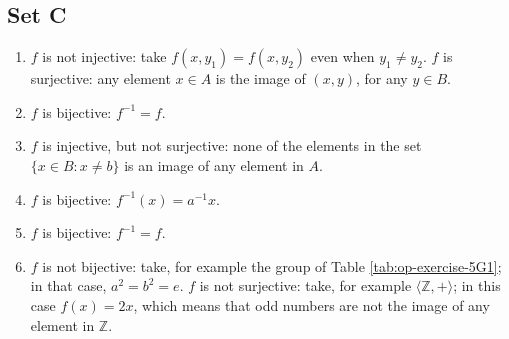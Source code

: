 \documentclass{article}
\newcommand{\angled}[1]{\langle#1\rangle}
\begin{document}
\subsection{Set C}
\begin{enumerate}
    \item $f$ is not injective: take $f(x, y_1) = f(x, y_2)$ even when $y_1 \ne y_2$. $f$ is surjective: any element $x \in A$ is the image of $(x, y)$, for any $y \in B$.

    \item $f$ is bijective: $f^{-1} = f$.

    \item $f$ is injective, but not surjective: none of the elements in the set $\{x \in B: x \ne b\}$ is an image of any element in $A$.

    \item $f$ is bijective: $f^{-1}(x) = a^{-1}x$.

    \item $f$ is bijective: $f^{-1} = f$.

    \item $f$ is not bijective: take, for example the group of Table \ref{tab:op-exercise-5G1}; in that case, $a^2 = b^2 = e$. $f$ is not surjective: take, for example $\angled{\mathbb{Z}, +}$; in this case $f(x) = 2x$, which means that odd numbers are not the image of any element in $\mathbb{Z}$.
\end{enumerate}
\end{document}
